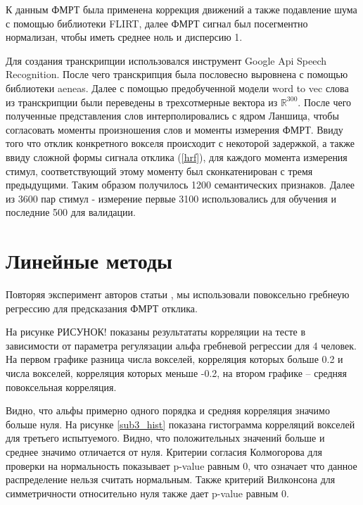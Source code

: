 \documentclass[pdftex,ptm,12pt,a4paper]{report}
\theoremstyle{definition}
\begin{document}
К данным ФМРТ была применена коррекция движений а также подавление шума с помощью библиотеки FLIRT, далее ФМРТ сигнал был посегментно нормализан, чтобы иметь среднее ноль и дисперсию 1. 

Для создания транскрипции использовался инструмент Google Api Speech Recognition. После чего транскрипция была пословесно выровнена с помощью библиотеки aeneas.
Далее с помощью предобученной модели word to vec слова из транскрипции были переведены в трехсотмерные вектора из $\mathbb{R}^{300}.$ После чего полученные представления слов интерполировались с ядром Ланшица, чтобы согласовать моменты произношения слов и моменты измерения ФМРТ. Ввиду того что отклик конкретного вокселя происходит с некоторой задержкой, а также ввиду сложной формы сигнала отклика (\ref{hrf}), для каждого момента измерения стимул, соответствующий этому моменту был сконкатенирован с тремя предыдущими. Таким образом получилось 1200 семантических признаков. Далее из 3600 пар стимул - измерение первые 3100 использовались для обучения и последние 500 для валидации.


\section{Линейные методы}

Повторяя эксперимент авторов статьи \citep{huth2016natural}, мы использовали повоксельно гребнеую регрессию для предсказания ФМРТ отклика.

На рисунке РИСУНОК! показаны результататы корреляции на тесте в зависимости от параметра регулязации альфа гребневой регрессии для 4 человек. На первом графике разница числа вокселей, корреляция которых больше 0.2 и числа вокселей, корреляция которых меньше -0.2, на втором графике -- средняя повоксельная корреляция.

Видно, что альфы примерно одного порядка и средняя корреляция значимо больше нуля. На рисунке \ref{sub3_hist} показана гистограмма корреляций вокселей для третьего испытуемого. Видно, что положительных значений больше и среднее значимо отличается от нуля. Критерии согласия Колмогорова для проверки на нормальность показывает p-value равным 0, что означает что данное распределение нельзя считать нормальным. Также критерий Вилконсона для  симметричности относительно нуля также дает p-value равным 0.
\end{document}
